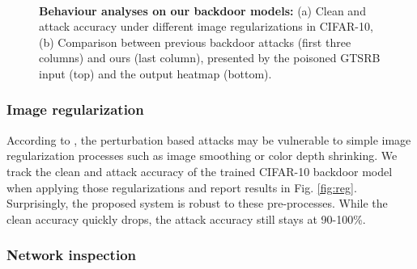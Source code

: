 \begin{figure}[t]
\centering
{}
~~
    \vspace{-1mm}
\caption{\textbf{Behaviour analyses on our backdoor models:} (a) Clean and attack accuracy under different image regularizations in CIFAR-10, (b) Comparison between previous backdoor attacks \cite{gu2017badnets,ji2019programmable,salem2020dynamic} (first three columns) and ours (last column), presented by the poisoned GTSRB input (top) and the output heatmap (bottom).}
\label{fig:behavior}
\end{figure}


\subsubsection{Image regularization}
According to \cite{xu2017feature}, the perturbation based attacks may be vulnerable to simple image regularization processes such as image smoothing or color depth shrinking. We track the clean and attack accuracy of the trained CIFAR-10 backdoor model when applying those regularizations and report results in Fig. \ref{fig:reg}. Surprisingly, the proposed system is  robust to these pre-processes. While the clean accuracy quickly drops, the attack accuracy still stays at 90-100\%. 

\subsubsection{Network inspection}

